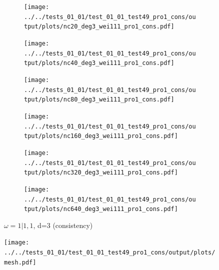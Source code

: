 \documentclass[11pt,a4paper]{article}
\theoremstyle{plain}
\theoremstyle{definition}
\begin{document}
\begin{figure}[H]
\begin{subfigure}[b]{0.48\textwidth}
\texttt{[image: ../../tests\_01\_01/test\_01\_01\_test49\_pro1\_cons/output/plots/nc20\_deg3\_wei111\_pro1\_cons.pdf]}
\end{subfigure}\hspace*{\fill}
\begin{subfigure}[b]{0.48\textwidth}
\texttt{[image: ../../tests\_01\_01/test\_01\_01\_test49\_pro1\_cons/output/plots/nc40\_deg3\_wei111\_pro1\_cons.pdf]}
\end{subfigure}

\medskip
\begin{subfigure}[b]{0.48\textwidth}
\texttt{[image: ../../tests\_01\_01/test\_01\_01\_test49\_pro1\_cons/output/plots/nc80\_deg3\_wei111\_pro1\_cons.pdf]}
\end{subfigure}\hspace*{\fill}
\begin{subfigure}[b]{0.48\textwidth}
\texttt{[image: ../../tests\_01\_01/test\_01\_01\_test49\_pro1\_cons/output/plots/nc160\_deg3\_wei111\_pro1\_cons.pdf]}
\end{subfigure}

\medskip
\begin{subfigure}[b]{0.48\textwidth}
\texttt{[image: ../../tests\_01\_01/test\_01\_01\_test49\_pro1\_cons/output/plots/nc320\_deg3\_wei111\_pro1\_cons.pdf]}
\end{subfigure}\hspace*{\fill}
\begin{subfigure}[b]{0.48\textwidth}
\texttt{[image: ../../tests\_01\_01/test\_01\_01\_test49\_pro1\_cons/output/plots/nc640\_deg3\_wei111\_pro1\_cons.pdf]}
\end{subfigure}

\caption{$\omega=1|1,1$, d=3 (consistency)}
\end{figure}

\begin{figure}[H]
\centering
\texttt{[image: ../../tests\_01\_01/test\_01\_01\_test49\_pro1\_cons/output/plots/mesh.pdf]}
\end{figure}
\pagebreak
\end{document}
